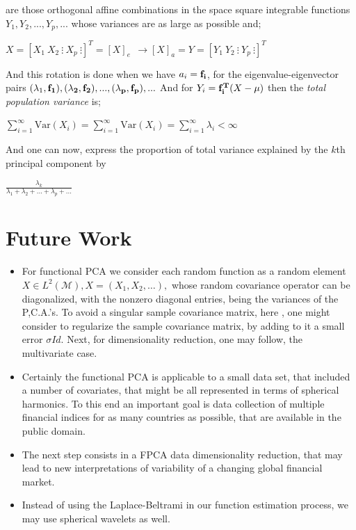 \documentclass[a0,landscape]{a0poster}
\begin{document}
\begin{multicols}{4}
\noindent {} are those {orthogonal affine} combinations in the space square integrable functions $Y_1,Y_2,..., Y_p,...$ whose variances are as large as possible and;\\
\begin{center}
 $X=[X_1~X_2~\vdots~X_p~\vdots]^{T}
= [X]_{e} ~~ \rightarrow [X]_{a}=Y=[Y_1~Y_2~\vdots~Y_p~\vdots]^{T}$
\end{center}

And this rotation is done when we have $a_i= \bf f_i$, for the eigenvalue-eigenvector pairs $(\lambda_1, \bf f_1),(\lambda_2, \bf f_2),...,(\lambda_p, \bf f_p), ...$
And for $Y_i= {\bf f_{i}^{T}} (X-\mu)$ then the {\em total population variance} is;
\begin{center}
$ \sum_{i=1}^{\infty} \text{Var}(X_i)= \sum_{i=1}^{\infty} \text{Var}(X_i)= \sum_{i=1}^{\infty} \lambda_i< \infty$
\end{center}
And one can now, express the proportion of total variance explained by the $k$th principal component by
\begin{center}
$ \frac{\lambda_{k}}{\lambda_1 + \lambda_2+ ...+ \lambda_p+ ...}$
\end{center}
\section*{\color{red}Future Work}
\begin{itemize}
\item For functional PCA we consider  each random function as a random element $X \in L^2(\mathcal{M}), X = (X_1, X_2, \dots),$ whose random covariance operator can be diagonalized, with the nonzero diagonal entries, being the variances of the P,C.A.'s. To avoid a singular sample covariance matrix, here , one might consider to regularize the sample covariance matrix, by adding to it a small error $\sigma Id.$ Next, for dimensionality reduction, one may follow, the multivariate case.
\item Certainly the functional PCA is applicable to a small data set, that included a number of covariates, that might be all represented in terms of spherical harmonics. To this end an important goal  is data collection of multiple financial indices for as many countries as possible, that are available in the public domain.
\item The next step consists in a FPCA data dimensionality reduction, that may lead to new interpretations of variability of  a changing global financial market.
\item Instead of using the Laplace-Beltrami in our function estimation process, we may use spherical wavelets as well.
\end{itemize}



\end{multicols}
\end{document}

